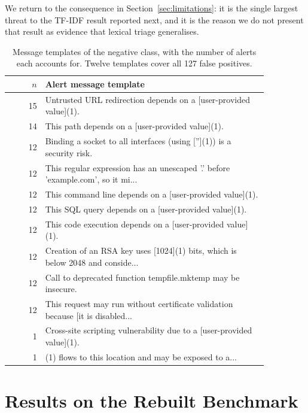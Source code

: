 \documentclass[journal]{IEEEtran}
\theoremstyle{definition}
\newcommand{\RNfp}{127}
\begin{document}
We return to the consequence in Section~\ref{sec:limitations}: it is the single
largest threat to the TF-IDF result reported next, and it is the reason we do
not present that result as evidence that lexical triage generalises.

\begin{table}[t]
\centering
\caption{Message templates of the negative class, with the number of alerts each
accounts for. Twelve templates cover all \RNfp{} false positives.}
\label{tab:fptmpl}
\footnotesize
\setlength{\tabcolsep}{4pt}
\begin{tabular}{@{}r>{\raggedright\arraybackslash}p{0.86\linewidth}@{}}
\toprule
$n$ & Alert message template \\
\midrule
15 & Untrusted URL redirection depends on a [user-provided value](1). \\
14 & This path depends on a [user-provided value](1). \\
12 & Binding a socket to all interfaces (using [''](1)) is a security risk. \\
12 & This regular expression has an unescaped '.' before 'example.com', so it mi... \\
12 & This command line depends on a [user-provided value](1). \\
12 & This SQL query depends on a [user-provided value](1). \\
12 & This code execution depends on a [user-provided value](1). \\
12 & Creation of an RSA key uses [1024](1) bits, which is below 2048 and conside... \\
12 & Call to deprecated function tempfile.mktemp may be insecure. \\
12 & This request may run without certificate validation because [it is disabled... \\
1 & Cross-site scripting vulnerability due to a [user-provided value](1). \\
1 & [Stack trace information](1) flows to this location and may be exposed to a... \\
\bottomrule
\end{tabular}
\end{table}

\section{Results on the Rebuilt Benchmark}
\label{sec:realresults}
\end{document}
